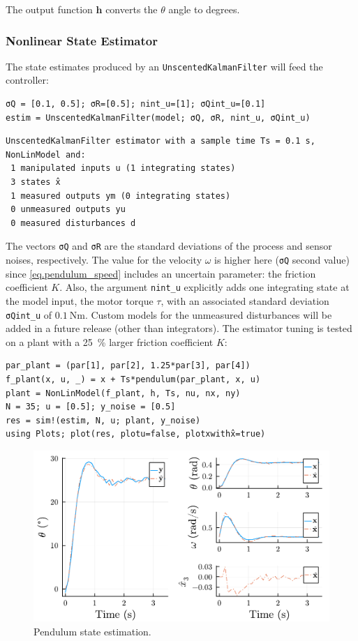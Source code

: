 The output function $\mathbf{h}$ converts the $\theta$ angle to degrees.

\subsubsection{Nonlinear State Estimator}

The state estimates produced by an \texttt{UnscentedKalmanFilter} will feed the controller:
\begin{verbatim}
σQ = [0.1, 0.5]; σR=[0.5]; nint_u=[1]; σQint_u=[0.1]
estim = UnscentedKalmanFilter(model; σQ, σR, nint_u, σQint_u)
\end{verbatim}
\spacerepl
\begin{verbatim}
UnscentedKalmanFilter estimator with a sample time Ts = 0.1 s, 
NonLinModel and:
 1 manipulated inputs u (1 integrating states)
 3 states x̂
 1 measured outputs ym (0 integrating states)
 0 unmeasured outputs yu
 0 measured disturbances d
\end{verbatim}
The vectors \texttt{σQ} and \texttt{σR} are the standard deviations of the process and sensor noises, respectively. The value for the velocity $\omega$ is higher here (\texttt{σQ} second value) since \eqref{eq.pendulum_speed} includes an uncertain parameter: the friction coefficient $K$. Also, the argument \texttt{nint\_u} explicitly adds one integrating state at the model input, the motor torque $\tau$, with an associated standard deviation \texttt{σQint\_u} of $\SI{0.1}{\newton\meter}$. Custom models for the unmeasured disturbances will be added in a future release (other than integrators). The estimator tuning is tested on a plant with a \SI{25}{\percent} larger friction coefficient $K$:
\begin{verbatim}
par_plant = (par[1], par[2], 1.25*par[3], par[4])
f_plant(x, u, _) = x + Ts*pendulum(par_plant, x, u)
plant = NonLinModel(f_plant, h, Ts, nu, nx, ny)
N = 35; u = [0.5]; y_noise = [0.5]
res = sim!(estim, N, u; plant, y_noise)
using Plots; plot(res, plotu=false, plotxwithx̂=true)
\end{verbatim}

\begin{figure}[h]
    \centering
    \includegraphics[width=\columnwidth]{fig/plot_NonLinMPC1.pdf}
    \caption{Pendulum state estimation.}
    \label{fig:plot_NonLinMPC1}
\end{figure}

